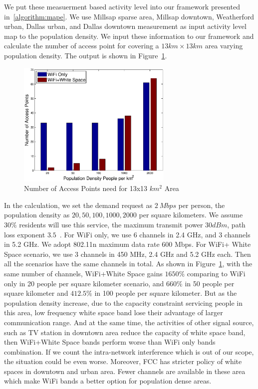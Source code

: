 We put these measuerment based activity level into our framework presented in~\ref{algorithm:mape}. We use Millsap
sparse area, Millsap downtown, Weatherford urban, Dallas urban, and Dallas downtown measurement as input activity level
map to the population density.
We input these information to our framework and calculate the number of access point for covering 
a $13 km \times 13 km$ area varying population density. The output is shown in Figure~\ref{fig:redensity}. 

   \begin{figure}
   \centering
   \includegraphics[width=74mm]{figures/redensity}
   \vspace{-0.1in}
   \caption{Number of Access Points need for 13x13 $km^2$ Area}
   \label{fig:redensity}
   \vspace{-0.1in}
   \end{figure}

In the calculation, we set the demand request as $2\ Mbps$ per person, the population
density as $20,50,100,1000,2000$ per square kilometers. We assume $30\%$ residents will use this
service, the maximum transmit power $30 dBm$, path loss exponent $3.5$~\cite{meikle2012global}. 
For WiFi only, we use 6 channels in 2.4 GHz, and 3 channels in 5.2 GHz. 
We adopt 802.11n maximum data rate 600 Mbps. For WiFi+ White Space
scenario, we use 3 channels in 450 MHz, 2.4 GHz and 5.2 GHz each. Then all the scenarios have the 
same channels in total. As shown in Figure~\ref{fig:redensity},
with the same number of channels, WiFi+White Space gains $1650\%$ comparing to WiFi only in 20 people 
per square kilometer scenario, and $660\%$ in 50 people per square kilometer and $412.5\%$ in 100 people
per square kilometer. But as the population density increase, due to the capacity constraint servicing
people in this area, low frequency white space band lose their advantage of larger communication range. 
And at the same time, the activities of other signal source, such as TV station in downtown area reduce
the capacity of white space band, then WiFi+White Space bands perform worse than WiFi only bands combination.
If we count the intra-network interference which is out of our scope, the situation could be even worse.
Moreover, FCC has stricter policy of white spaces in downtown and urban area. Fewer channels
are available in these area which make WiFi bands a better option for population dense areas.



